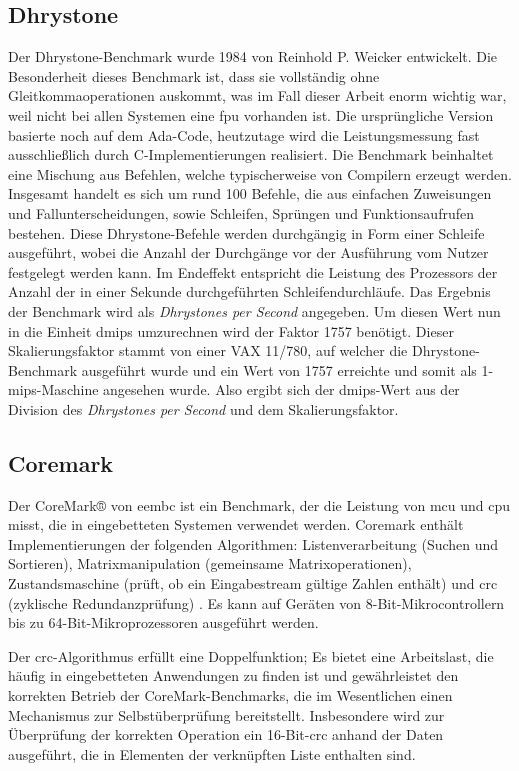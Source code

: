 \subsection{Dhrystone}\label{kap:dhrystone}
Der Dhrystone-Benchmark wurde 1984 von Reinhold P. Weicker entwickelt. Die Besonderheit dieses Benchmark ist, dass sie vollständig
ohne Gleitkommaoperationen auskommt, was im Fall dieser Arbeit enorm wichtig war, weil nicht bei allen Systemen eine \ac{fpu} vorhanden ist.
Die ursprüngliche Version basierte noch auf dem Ada-Code, heutzutage wird die Leistungsmessung fast ausschließlich durch C-Implementierungen
 realisiert. Die Benchmark beinhaltet eine Mischung aus Befehlen, welche typischerweise von Compilern erzeugt werden. Insgesamt handelt es sich
 um rund 100 Befehle, die aus einfachen Zuweisungen und Fallunterscheidungen, sowie Schleifen, Sprüngen und Funktionsaufrufen bestehen.
  Diese Dhrystone-Befehle werden durchgängig in Form einer Schleife ausgeführt, wobei die Anzahl der Durchgänge vor der Ausführung vom
  Nutzer festgelegt werden kann. Im Endeffekt entspricht die Leistung des Prozessors der Anzahl der in einer Sekunde durchgeführten Schleifendurchläufe.
  Das Ergebnis der Benchmark wird als \emph{Dhrystones per Second} angegeben. Um diesen Wert nun in die Einheit \ac{dmips} umzurechnen wird der Faktor 1757 benötigt. Dieser Skalierungsfaktor
  stammt von einer VAX 11/780, auf welcher die Dhrystone-Benchmark ausgeführt wurde und ein Wert von 1757 erreichte und somit als 1-\ac{mips}-Maschine angesehen wurde. Also ergibt sich der
  \ac{dmips}-Wert aus der Division des \emph{Dhrystones per Second} und dem Skalierungsfaktor.~\cite{benchmark}

  \subsection{Coremark}\label{kap:coremark}
  Der CoreMark® von \ac{eembc} ist ein Benchmark, der die Leistung von \ac{mcu} und \ac{cpu} misst, die in eingebetteten Systemen verwendet werden.
   Coremark enthält Implementierungen der folgenden Algorithmen: Listenverarbeitung (Suchen und Sortieren),
    Matrixmanipulation (gemeinsame Matrixoperationen), Zustandsmaschine (prüft, ob ein Eingabestream gültige Zahlen enthält) und \ac{crc} (zyklische Redundanzprüfung) .
    Es kann auf Geräten von 8-Bit-Mikrocontrollern bis zu 64-Bit-Mikroprozessoren ausgeführt werden.

  Der \ac{crc}-Algorithmus erfüllt eine Doppelfunktion; Es bietet eine Arbeitslast, die häufig in eingebetteten Anwendungen zu finden ist
  und gewährleistet den korrekten Betrieb der CoreMark-Benchmarks, die im Wesentlichen einen Mechanismus zur Selbstüberprüfung bereitstellt.
   Insbesondere wird zur Überprüfung der korrekten Operation ein 16-Bit-\ac{crc} anhand der Daten ausgeführt, die in Elementen der verknüpften Liste enthalten sind.

